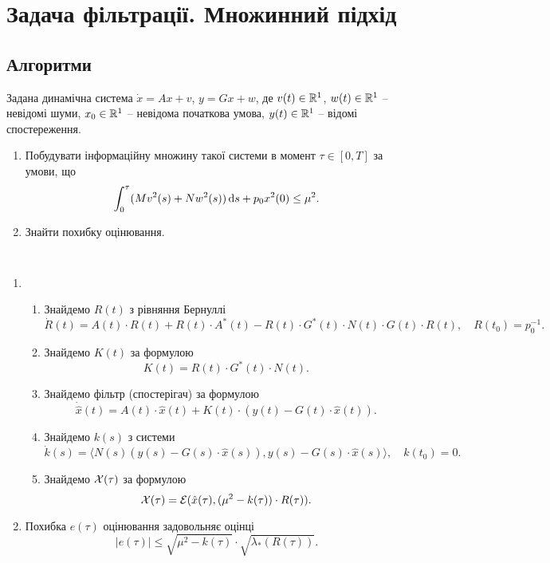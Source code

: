 \section{Задача фільтрації. Множинний підхід}

\subsection{Алгоритми}

\begin{problem*}
	Задана динамічна система $\dot x = A x + v$, $y = G x + w$, де $v(t) \in \mathbb{R}^1$, $w(t) \in \mathbb{R}^1$ -- невідомі шуми, $x_0 \in \mathbb{R}^1$ -- невідома початкова умова, $y(t) \in \mathbb{R}^1$ -- відомі спостереження. 

	\begin{enumerate}
		\item Побудувати інформаційну множину такої системи в момент $\tau \in [0, T]$ за умови, що \[ \int_0^\tau (Mv^2(s) + Nw^2(s)) \mathop{}\!\mathrm{d} s + p_0x^2(0) \le \mu^2. \]
		\item Знайти похибку оцінювання.
	\end{enumerate}
\end{problem*}

\begin{algorithm} \tt
	\begin{enumerate}
		\item \begin{enumerate}
			\item Знайдемо $R(t)$ з рівняння Бернуллі \[\dot R (t)= A (t) \cdot R (t)+ R (t) \cdot A^* (t)- R (t) \cdot G^* (t) \cdot N (t) \cdot G (t) \cdot R(t), \quad R(t_0) = p_0^{-1}. \]
			\item Знайдемо $K(t)$ за формулою \[K (t)= R (t) \cdot G^* (t) \cdot N(t).\]
			\item Знайдемо фільтр (спостерігач) за формулою \[ \dot{\hat{x}} (t) = A (t) \cdot \hat x (t) + K (t) \cdot (y (t) - G (t) \cdot \hat x (t)). \]
			\item Знайдемо $k(s)$ з системи \[ \dot k (s) = \langle N(s) (y(s) - G(s) \cdot \hat x(s)), y(s) - G(s) \cdot \hat x(s)\rangle, \quad k(t_0) = 0. \]
			\item Знайдемо $\mathcal{X}(\tau)$ за формулою \[ \mathcal{X}(\tau) = \mathcal{E} (\hat x(\tau), (\mu^2 - k(\tau)) \cdot R(\tau)). \]
		\end{enumerate}
		\item Похибка $e(\tau)$ оцінювання задовольняє оцінці \[ |e(\tau)| \le \sqrt{\mu^2-k(\tau)} \cdot \sqrt{\lambda_* (R(\tau))}.\]
	\end{enumerate}
\end{algorithm}

